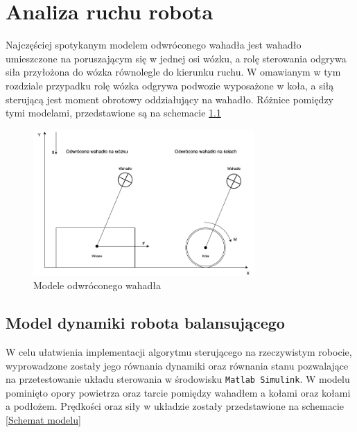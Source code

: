 \chapter{Analiza ruchu robota}
\label{chap:analizaruchurobota}

Najczęściej spotykanym modelem odwróconego wahadła jest wahadło umieszczone na poruszającym się w jednej osi wózku, a rolę sterowania odgrywa siła przyłożona do wózka równolegle do kierunku ruchu. W omawianym w tym rozdziale przypadku rolę wózka odgrywa podwozie wyposażone w koła, a siłą sterującą jest moment obrotowy oddziałujący na wahadło. Różnice pomiędzy tymi modelami, przedstawione są na schemacie \ref{Modele odwroconego wahadla}

    \begin{figure}[h!]
	    \centering
	    \includegraphics[width=0.75\textwidth]{Rysunki/Rozdzial02/Schemat_wozek_kola.png}
	    \caption{Modele odwróconego wahadła}
	    \label{Modele odwroconego wahadla}
	\end{figure}

\section{Model dynamiki robota balansującego}

W celu ułatwienia implementacji algorytmu sterującego na rzeczywistym robocie, wyprowadzone zostały jego równania dynamiki oraz równania stanu pozwalające na przetestowanie układu sterowania w środowisku \texttt{Matlab Simulink}. W modelu pominięto opory powietrza oraz tarcie pomiędzy wahadłem a kołami oraz kołami a podłożem. Prędkości oraz siły w układzie zostały przedstawione na schemacie \ref{Schemat modelu}

